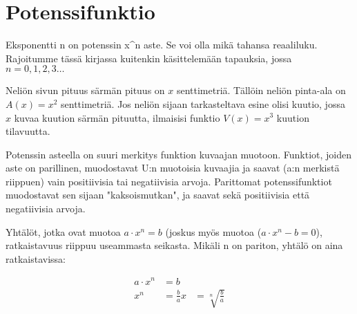 \chapter{Potenssifunktio}


Eksponentti n on potenssin x^n aste. Se voi olla mikä tahansa reaaliluku. Rajoitumme tässä kirjassa kuitenkin käsittelemään tapauksia, jossa $n = 0, 1, 2, 3\ldots $

\begin{esimerkki}
Neliön sivun pituus särmän pituus on $x$ senttimetriä. Tällöin neliön pinta-ala on $A(x)=x^2$ senttimetriä. Jos neliön sijaan tarkasteltava esine olisi kuutio, jossa $x$ kuvaa kuution särmän pituutta, ilmaisisi funktio $V(x)=x^3$ kuution tilavuutta.
\end{esimerkki}

Potenssin asteella on suuri merkitys funktion kuvaajan muotoon. Funktiot, joiden aste on parillinen, muodostavat U:n muotoisia kuvaajia ja saavat (a:n merkistä riippuen) vain positiivisia tai negatiivisia arvoja. Parittomat potenssifunktiot muodostavat sen sijaan "kaksoismutkan", ja saavat sekä positiivisia että negatiivisia arvoja.


Yhtälöt, jotka ovat muotoa $a\cdot x^n = b$ (joskus myös muotoa  ($a\cdot x^n - b = 0$), ratkaistavuus riippuu useammasta seikasta. Mikäli n on pariton, yhtälö on aina ratkaistavissa:

\begin{align*}
a\cdot x^n &= b \\
x^n &= \frac{b}{a} 
x &= \sqrt[n]{\frac{b}{a}}
\end{align*}

